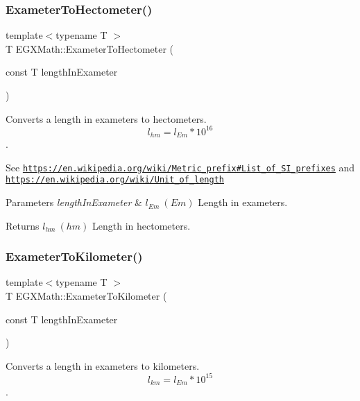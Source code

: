 \subsubsection{\texorpdfstring{Exameter\+To\+Hectometer()}{ExameterToHectometer()}}
{\footnotesize\ttfamily template$<$typename T $>$ \\
T E\+G\+X\+Math\+::\+Exameter\+To\+Hectometer (\begin{DoxyParamCaption}\item[{const T}]{length\+In\+Exameter }\end{DoxyParamCaption})}



Converts a length in exameters to hectometers. \[ l_{hm}=l_{Em} * 10^{16} \]. 

See \href{https://en.wikipedia.org/wiki/Metric_prefix#List_of_SI_prefixes}{\tt https\+://en.\+wikipedia.\+org/wiki/\+Metric\+\_\+prefix\#\+List\+\_\+of\+\_\+\+S\+I\+\_\+prefixes} and \href{https://en.wikipedia.org/wiki/Unit_of_length}{\tt https\+://en.\+wikipedia.\+org/wiki/\+Unit\+\_\+of\+\_\+length} 
\begin{DoxyParams}{Parameters}
{\em length\+In\+Exameter} & $ l_{Em}\ (Em)$ Length in exameters. \\
\hline
\end{DoxyParams}
\begin{DoxyReturn}{Returns}
$ l_{hm}\ (hm)$ Length in hectometers. 
\end{DoxyReturn}
\mbox{\label{group___e_g_x_math-_conversions-_length_conversions-_exameter-_s_i_gad8c1732c3b4a07b330d5327c099bbd7c}} 
\subsubsection{\texorpdfstring{Exameter\+To\+Kilometer()}{ExameterToKilometer()}}
{\footnotesize\ttfamily template$<$typename T $>$ \\
T E\+G\+X\+Math\+::\+Exameter\+To\+Kilometer (\begin{DoxyParamCaption}\item[{const T}]{length\+In\+Exameter }\end{DoxyParamCaption})}



Converts a length in exameters to kilometers. \[ l_{km}=l_{Em} * 10^{15} \]. 

